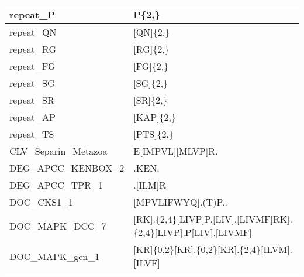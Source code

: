 \begin{landscape}
\begin{longtable}{|l|l|}
\hline
repeat\_P              & P\{2,\}                                                                                                                    \\
\hline
repeat\_QN             & {[}QN]\{2,\}                                                                                                               \\
\hline
repeat\_RG             & {[}RG]\{2,\}                                                                                                               \\
\hline
repeat\_FG             & {[}FG]\{2,\}                                                                                                               \\
\hline
repeat\_SG             & {[}SG]\{2,\}                                                                                                               \\
\hline
repeat\_SR             & {[}SR]\{2,\}                                                                                                               \\
\hline
repeat\_AP             & {[}KAP]\{2,\}                                                                                                              \\
\hline
repeat\_TS             & {[}PTS]\{2,\}                                                                                                              \\
\hline
CLV\_Separin\_Metazoa  & E[IMPVL][MLVP]R.                                                                                                           \\
\hline
DEG\_APCC\_KENBOX\_2   & .KEN.                                                                                                                      \\
\hline
DEG\_APCC\_TPR\_1      & .[ILM]R                                                                                                                    \\
\hline
DOC\_CKS1\_1           & {[}MPVLIFWYQ].(T)P..                                                                                                       \\
\hline
DOC\_MAPK\_DCC\_7      & {[}RK].\{2,4\}{[}LIVP]P.[LIV].[LIVMF]\textbar{}{[}RK].\{2,4\}{[}LIVP].P[LIV].[LIVMF]                                       \\
\hline
DOC\_MAPK\_gen\_1      & {[}KR]\{0,2\}{[}KR].\{0,2\}{[}KR].\{2,4\}{[}ILVM].[ILVF]                                                                   \\

\end{longtable}
\end{landscape}
